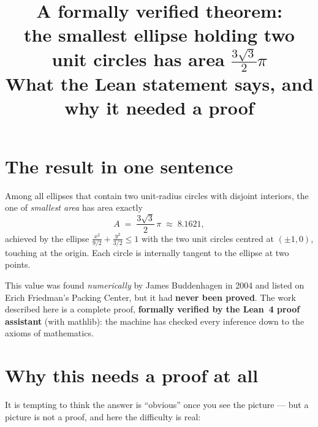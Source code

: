 \documentclass[11pt]{article}
\title{A formally verified theorem:\\
the smallest ellipse holding two unit circles has area $\tfrac{3\sqrt3}{2}\pi$\\[4pt]
\large What the Lean statement says, and why it needed a proof}
\author{}
\date{}
\begin{document}
\maketitle

\section{The result in one sentence}

Among all ellipses that contain two unit-radius circles with disjoint interiors, the one of
\emph{smallest area} has area exactly
\[
  A \;=\; \frac{3\sqrt3}{2}\,\pi \;\approx\; 8.1621,
\]
achieved by the ellipse $\frac{x^2}{9/2}+\frac{y^2}{3/2}\le 1$ with the two unit circles centred at
$(\pm1,0)$, touching at the origin. Each circle is internally tangent to the ellipse at two points.

\begin{center}
\end{center}

This value was found \emph{numerically} by James Buddenhagen in 2004 and listed on Erich Friedman's
Packing Center, but it had \textbf{never been proved}. The work described here is a complete proof,
\textbf{formally verified by the Lean~4 proof assistant} (with mathlib): the machine has checked every
inference down to the axioms of mathematics.

\section{Why this needs a proof at all}

It is tempting to think the answer is ``obvious'' once you see the picture --- but a picture is not a
proof, and here the difficulty is real:
\end{document}
